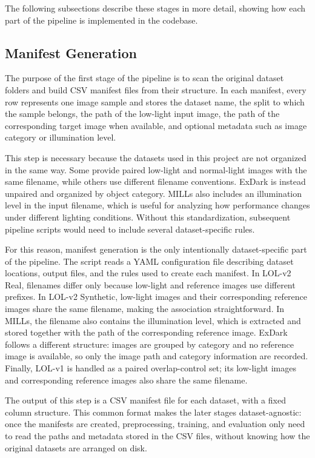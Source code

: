 The following subsections describe these stages in more detail, showing how each part of the pipeline is implemented in the codebase.

\subsection{Manifest Generation}
\label{sec:manifest_generation}

The purpose of the first stage of the pipeline is to scan the original dataset folders and build CSV manifest files from their structure. In each manifest, every row represents one image sample and stores the dataset name, the split to which the sample belongs, the path of the low-light input image, the path of the corresponding target image when available, and optional metadata such as image category or illumination level.

This step is necessary because the datasets used in this project are not organized in the same way. Some provide paired low-light and normal-light images with the same filename, while others use different filename conventions. ExDark is instead unpaired and organized by object category. MILLs also includes an illumination level in the input filename, which is useful for analyzing how performance changes under different lighting conditions. Without this standardization, subsequent pipeline scripts would need to include several dataset-specific rules.

For this reason, manifest generation is the only intentionally dataset-specific part of the pipeline. The script reads a YAML configuration file describing dataset locations, output files, and the rules used to create each manifest. In LOL-v2 Real, filenames differ only because low-light and reference images use different prefixes. In LOL-v2 Synthetic, low-light images and their corresponding reference images share the same filename, making the association straightforward. In MILLs, the filename also contains the illumination level, which is extracted and stored together with the path of the corresponding reference image. ExDark follows a different structure: images are grouped by category and no reference image is available, so only the image path and category information are recorded. Finally, LOL-v1 is handled as a paired overlap-control set; its low-light images and corresponding reference images also share the same filename.

The output of this step is a CSV manifest file for each dataset, with a fixed column structure. This common format makes the later stages dataset-agnostic: once the manifests are created, preprocessing, training, and evaluation only need to read the paths and metadata stored in the CSV files, without knowing how the original datasets are arranged on disk.

